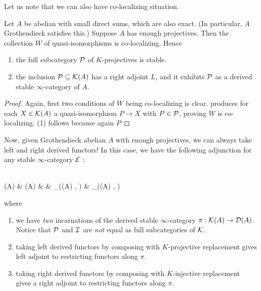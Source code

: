\documentclass{article}
\begin{document}
Let us note that we can also have co-localizing situation.
\begin{prop}
  Let $A$ be abelian with small direct sums,
  which are also exact. (In particular, $A$ Grothendieck satisfies this.)
  Suppose $A$ has enough projectives.
  Then the collection $W$ of quasi-isomorphisms is co-localizing.
  Hence \begin{enumerate}
    \item the full subcategory $\mathcal{P}$ of $K$-projectives is stable.
    \item the inclusion $\mathcal{P} \subseteq \mathcal{K}(A)$ has a right adjoint $L$,
    and it exhibits $\mathcal{P}$ as a derived stable $\infty$-category of $A$.
  \end{enumerate}
\end{prop}
\begin{proof}
  Again, first two conditions of $W$ being co-localizing is clear.
  \cite[Theorem 14.4.3]{KS06} produces for each $X \in \mathcal{K}(A)$
  a quasi-isomorphism $P \to X$ with $P \in \mathcal{P}$,
  proving $W$ is co-localizing.
  (1) follows because again $P$
\end{proof}
Now, given Grothendieck abelian $A$ with enough projectives,
we can always take left and right derived functors!
In this case, we have the following adjunction for any
stable $\infty$-category $\mathcal{E}$ : 
\begin{cd}
  {} \\
	{(A)} & {(A)} & \rightsquigarrow & {_{}((A) , )} & {_{}((A) , )} \\
	{}
	\arrow["\sim"', from=1-1, to=2-1]
	\arrow["p", shift left=2, from=1-1, to=2-2]
	\arrow["\bot"{marking, allow upside down}, draw=none, from=1-1, to=2-2]
	\arrow[shift left=2, from=2-2, to=1-1]
	\arrow["\pi"{description}, from=2-2, to=2-1]
	\arrow[shift right=2, from=2-2, to=3-1]
	\arrow["{F \mapsto LF = F p}", shift left=5, from=2-4, to=2-5]
	\arrow["{F \mapsto RF = Fi}"', shift right=5, from=2-4, to=2-5]
	\arrow["\bot"{description}, shift left=3, draw=none, from=2-4, to=2-5]
	\arrow["\bot"{description}, shift right=3, draw=none, from=2-4, to=2-5]
	\arrow["{\pi^*}"{description}, from=2-5, to=2-4]
	\arrow["\sim", from=3-1, to=2-1]
	\arrow["i"', shift right=2, from=3-1, to=2-2]
	\arrow["\bot"{marking, allow upside down}, draw=none, from=3-1, to=2-2]
\end{cd}
where \begin{enumerate}
  \item we have \emph{two} incarnations of the derived stable $\infty$-category
  $\pi : \mathcal{K}(A) \to \mathcal{D}(A)$.
  Notice that $\mathcal{P}$ and $\mathcal{I}$ are \emph{not} equal as 
  full subcategories of $\mathcal{K}$.
  \item taking left derived functors by composing with $K$-projective
  replacement gives left adjoint to restricting functors along $\pi$.
  \item taking right derived functors by composing with $K$-injective
  replacement gives a right adjoint to restricting functors along $\pi$.
\end{enumerate}
\end{document}
